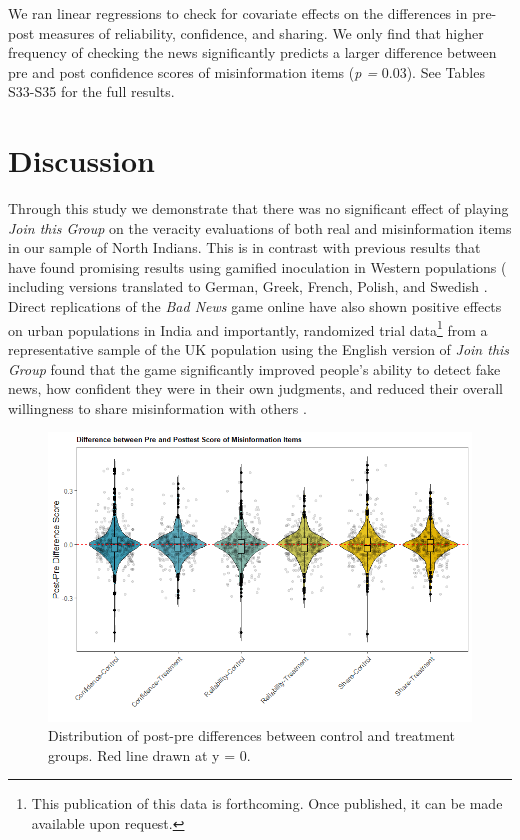 \documentclass[empirical, authordate, issue]{jote-new-article}
\begin{document}
We ran linear regressions to check for covariate effects on the differences in pre-post measures of reliability, confidence, and sharing. We only find that higher frequency of checking the news significantly predicts a larger difference between pre and post confidence scores of misinformation items (\emph{p = }0.03). See Tables S33-S35 for the full results.


\section{Discussion}

Through this study we demonstrate that there was no significant effect of playing \emph{Join this Group }on the veracity evaluations of both real and misinformation items in our sample of North Indians. This is in contrast with previous results that have found promising results using gamified inoculation in Western populations ( including versions translated to German, Greek, French, Polish, and Swedish \parencite{Basol2021, Roozenbeek2020}. Direct replications of the \emph{Bad News} game online have also shown positive effects on urban populations in India \parencite{Iyengar2022} and importantly, randomized trial data\footnote{ This publication of this data is forthcoming. Once published, it can be made available upon request.} from a representative sample of the UK population using the English version of \emph{Join this Group} found that the game significantly improved people's ability to detect fake news, how confident they were in their own judgments, and reduced their overall willingness to share misinformation with others \parencite{Basol2022}.

\begin{figure}[t]

  \begin{fullwidth}
    \includegraphics[width=\linewidth]{media/image6.jpeg}
    \caption{Distribution of post-pre differences between control and treatment groups. Red line drawn at y = 0.}
    \label{fig:figure6}
  \end{fullwidth}


\end{figure}
\end{document}
